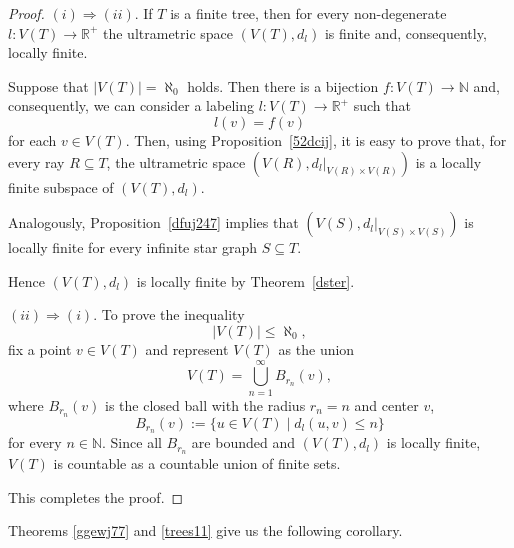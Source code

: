 \documentclass[pdflatex,sn-mathphys-num]{sn-jnl}%
\theoremstyle{thmstyletwo}%
\begin{document}
\begin{proof}

$(i) \Rightarrow (ii)$. %
If $T$ is a finite tree, then for every non-degenerate $l\colon V(T) \to \mathbb{R}^+$ the ultrametric space $(V(T), d_l)$ 
is finite and, consequently, locally finite.


Suppose that $|V(T)| = \aleph_0$ holds. Then there is a bijection 
$
f\colon V(T) \to \mathbb{N}
$
and, consequently, we can consider a labeling $l\colon  V(T) \to \mathbb{R}^+$ such that 
\begin{equation*}
l(v) = f(v)
\end{equation*}
for each $v \in V(T)$. Then, using Proposition~\ref{52dcij}, it is easy to prove that, for every ray $R \subseteq T$, the ultrametric space $(V(R), d_l|_{V(R) \times V(R)})$ is a locally finite subspace of $(V(T), d_l)$.

Analogously, Proposition~\ref{dfuj247} implies that $(V(S), d_l|_{V(S) \times V(S)})$ is locally finite for every infinite star graph $S \subseteq T$. 

Hence $(V(T), d_l)$ is locally finite by Theorem~\ref{dster}.

$(ii) \Rightarrow (i)$. %
To prove the inequality 
\begin{equation}\label{baas9}
|V(T)| \leq \aleph_0,
\end{equation}
fix a point $v \in V(T)$ and represent $V(T)$ as the union
\begin{equation*}
V(T) = \bigcup_{n=1}^{\infty} B_{r_n}(v),
\end{equation*}
where $B_{r_n}(v)$ is the closed ball with the radius $r_n = n$ and center $v$,
\begin{equation*}
B_{r_n}(v) := \{u \in V(T) \mid d_l(u,v) \leq n \}
\end{equation*}
 for every $n \in \mathbb{N}$. Since all $B_{r_n}$ are bounded and $(V(T), d_l)$ is locally finite, $V(T)$ is countable as a countable union of finite sets.

This completes the proof.

\end{proof}


Theorems \ref{ggewj77} and \ref{trees11} give us the following corollary.
\end{document}
